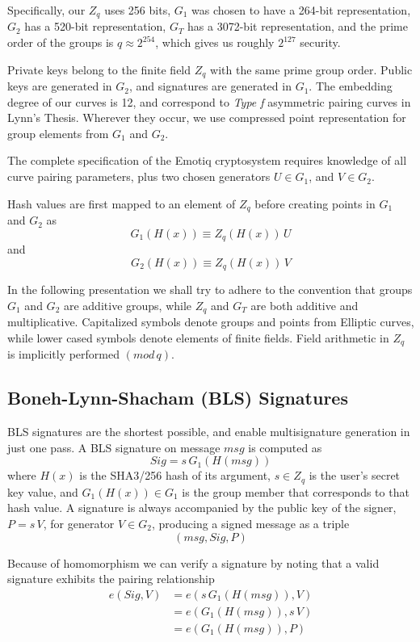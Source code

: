 \documentclass{yellowpaper}
\begin{document}
Specifically, our $Z_q$ uses 256 bits, $G_1$ was chosen to have a 264-bit representation, $G_2$ has a 520-bit representation, $G_T$ has a 3072-bit representation, and the prime order of the groups is $q \approx  2^{254}$, which gives us roughly $2^{127}$ security.

Private keys belong to the finite field $Z_q$ with the same prime group order. Public keys are generated in $G_2$, and signatures are generated in $G_1$. The embedding degree of our curves is 12, and correspond to {\emph{Type f}} asymmetric pairing curves in Lynn's Thesis\cite{thesis}. Wherever they occur, we use  compressed point representation for group elements from $G_1$ and $G_2$.

The complete specification of the Emotiq cryptosystem requires knowledge of all curve pairing parameters, plus two chosen generators $U \in G_1$, and $V \in G_2$. 

Hash values are first mapped to an element of $Z_q$ before creating points in $G_1$ and $G_2$ as 
$$G_1(H(x)) \equiv Z_q(H(x)) \, U$$ 
and 
$$G_2(H(x)) \equiv Z_q(H(x)) \, V$$

In the following presentation we shall try to adhere to the convention that groups $G_1$ and $G_2$ are additive groups, while $Z_q$ and $G_T$ are both additive and multiplicative. Capitalized symbols denote groups and points from Elliptic curves, while lower cased symbols denote elements of finite fields. Field arithmetic in $Z_q$ is implicitly performed $(mod\,q)$.

\subsection{Boneh-Lynn-Shacham (BLS) Signatures}

BLS signatures are the shortest possible, and enable multisignature generation in just one pass. A BLS signature on message $msg$ is computed as $$Sig = s \, G_1(H(msg))$$ where $H(x)$ is the SHA3/256 hash of its argument, $s \in Z_q$ is the user's secret key value, and $G_1(H(x)) \in G_1$ is the group member that corresponds to that hash value. A signature is always accompanied by the public key of the signer, $P = s \, V$, for generator $V \in G_2$,  producing a signed message as a triple $$(msg, Sig, P)$$

Because of homomorphism we can verify a signature by noting that a valid signature exhibits the pairing relationship 
$$
\begin{align}
    e(Sig,V) &= e(s \, G_1(H(msg)),V)\\
             &= e(G_1(H(msg)), s \, V) \\
             &= e(G_1(H(msg)), P)
\end{align}
$$
\end{document}
